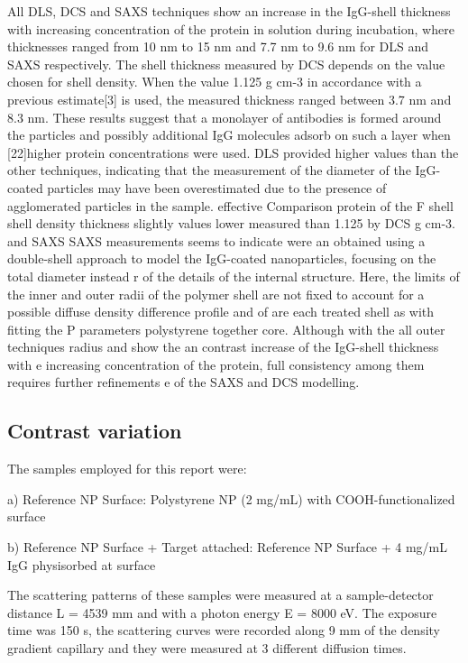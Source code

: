 All DLS, DCS and SAXS techniques show an increase in the IgG-shell thickness with increasing concentration of the protein in solution during incubation, where thicknesses ranged from 10 nm to 15 nm and 7.7 nm to 9.6 nm for DLS and SAXS respectively. The shell thickness measured by DCS depends on the value chosen for shell density. When the value 1.125 g cm-3 in accordance with a previous estimate[3] is used, the measured thickness ranged between 3.7 nm and 8.3 nm. These results suggest that a monolayer of antibodies is formed around the particles and possibly additional IgG molecules adsorb on such a layer when
[22]higher protein concentrations were used. DLS provided higher values than the other techniques, indicating that the measurement of the diameter of the IgG-coated particles may have been overestimated due to the presence of agglomerated particles in the sample. effective Comparison protein of the F shell shell density thickness slightly values lower measured than 1.125 by DCS g cm-3. and SAXS SAXS measurements seems to indicate were  an obtained using a double-shell approach to model the IgG-coated nanoparticles, focusing on the total diameter instead r of the details of the internal structure. Here, the limits of the inner and outer radii of the polymer shell are not fixed to account for a possible diffuse density difference profile and of are each treated shell as with fitting the P parameters polystyrene together core. Although with the all outer techniques radius and show the an contrast  increase of the IgG-shell thickness with e  increasing concentration of the protein, full consistency among them requires further refinements e of the SAXS and DCS modelling. 

\subsection{Contrast variation}

The samples employed for this report were:

a) Reference NP Surface: Polystyrene NP (2 mg/mL) with COOH-functionalized surface

b) Reference NP Surface + Target attached: Reference NP Surface + 4 mg/mL IgG physisorbed at surface

The scattering patterns of these samples were measured at a sample-detector distance L = 4539 mm and with a photon energy E = 8000 eV. The exposure time was 150 s, the scattering curves were recorded along 9 mm of the density gradient capillary and they were measured at 3 different diffusion times.


